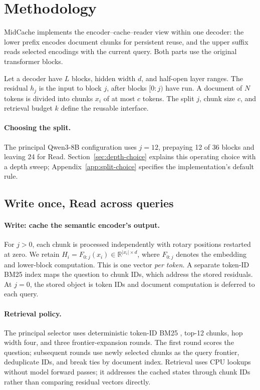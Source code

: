 \section{Methodology}
\label{sec:method}
MidCache implements the encoder--cache--reader view within one decoder: the lower prefix encodes document chunks for persistent reuse, and the upper suffix reads selected encodings with the current query. Both parts use the original transformer blocks.

Let a decoder have $L$ blocks, hidden width $d$, and half-open layer ranges. The residual $h_j$ is the input to block $j$, after blocks $[0{:}j)$ have run. A document of $N$ tokens is divided into chunks $x_i$ of at most $c$ tokens. The split $j$, chunk size $c$, and retrieval budget $k$ define the reusable interface.

\paragraph{Choosing the split.}
The principal Qwen3-8B configuration uses $j=12$, prepaying 12 of 36 blocks and leaving 24 for Read. Section~\ref{sec:depth-choice} explains this operating choice with a depth sweep; Appendix~\ref{app:split-choice} specifies the implementation's default rule.

\subsection{Write once, Read across queries}
\label{sec:interface}
\paragraph{Write: cache the semantic encoder's output.}
For $j>0$, each chunk is processed independently with rotary positions restarted at zero. We retain $H_i=F_{0:j}(x_i)\in\mathbb{R}^{|x_i|\times d}$, where $F_{0:j}$ denotes the embedding and lower-block computation. This is one vector \emph{per token}. A separate token-ID BM25 index maps the question to chunk IDs, which address the stored residuals. At $j=0$, the stored object is token IDs and document computation is deferred to each query.

\paragraph{Retrieval policy.}
The principal selector uses deterministic token-ID BM25 \citep{bm25}, top-12 chunks, hop width four, and three frontier-expansion rounds. The first round scores the question; subsequent rounds use newly selected chunks as the query frontier, deduplicate IDs, and break ties by document index. Retrieval uses CPU lookups without model forward passes; it addresses the cached states through chunk IDs rather than comparing residual vectors directly.

